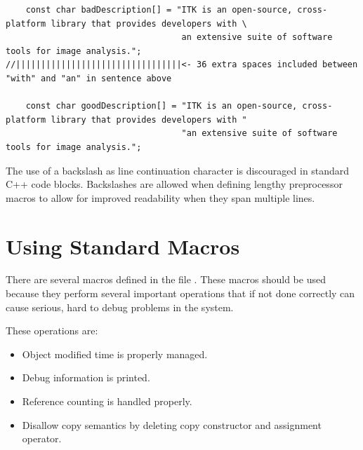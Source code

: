 \small
\begin{verbatim}
    const char badDescription[] = "ITK is an open-source, cross-platform library that provides developers with \
                                   an extensive suite of software tools for image analysis.";
//|||||||||||||||||||||||||||||||||<- 36 extra spaces included between "with" and "an" in sentence above

    const char goodDescription[] = "ITK is an open-source, cross-platform library that provides developers with "
                                   "an extensive suite of software tools for image analysis.";
\end{verbatim}
\normalsize

The use of a backslash as line continuation character is discouraged in standard C++ code blocks.
Backslashes are allowed when defining lengthy preprocessor macros to allow for
improved readability when they span multiple lines.

\section{Using Standard Macros}%
\label{sec:UsingStandardMacros}

There are several macros defined in the file . These macros
should be used because they perform several important operations that if not
done correctly can cause serious, hard to debug problems in the system.

These operations are:
\begin{itemize}
\item Object modified time is properly managed.
\item Debug information is printed.
\item Reference counting is handled properly.
\item Disallow copy semantics by deleting copy constructor and assignment
operator.
\end{itemize}

